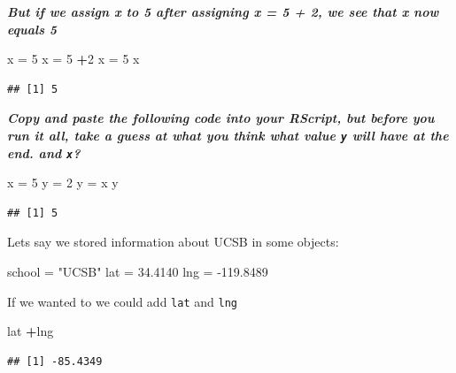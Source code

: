 \documentclass[
]{article}
\newenvironment{Shaded}{\begin{snugshade}}{\end{snugshade}}
\newcommand{\DecValTok}[1]{\textcolor[rgb]{0.00,0.00,0.81}{#1}}
\newcommand{\FloatTok}[1]{\textcolor[rgb]{0.00,0.00,0.81}{#1}}
\newcommand{\NormalTok}[1]{#1}
\newcommand{\OperatorTok}[1]{\textcolor[rgb]{0.81,0.36,0.00}{\textbf{#1}}}
\newcommand{\StringTok}[1]{\textcolor[rgb]{0.31,0.60,0.02}{#1}}
\begin{document}
\textbf{\emph{But if we assign x to 5 after assigning x = 5 + 2, we see
that x now equals 5}}

\begin{Shaded}
\begin{Highlighting}[]
\NormalTok{x =}\StringTok{ }\DecValTok{5} 
\NormalTok{x =}\StringTok{ }\DecValTok{5} \OperatorTok{+}\DecValTok{2}
\NormalTok{x =}\StringTok{ }\DecValTok{5} 
\NormalTok{x}
\end{Highlighting}
\end{Shaded}

\begin{verbatim}
## [1] 5
\end{verbatim}

\textbf{\emph{Copy and paste the following code into your RScript, but
before you run it all, take a guess at what you think what value
\texttt{y} will have at the end. and \texttt{x}?}}

\begin{Shaded}
\begin{Highlighting}[]
\NormalTok{x =}\StringTok{ }\DecValTok{5}
\NormalTok{y =}\StringTok{ }\DecValTok{2}
\NormalTok{y =}\StringTok{ }\NormalTok{x}
\NormalTok{y}
\end{Highlighting}
\end{Shaded}

\begin{verbatim}
## [1] 5
\end{verbatim}

Lets say we stored information about UCSB in some objects:

\begin{Shaded}
\begin{Highlighting}[]
\NormalTok{school =}\StringTok{ "UCSB"}
\NormalTok{lat =}\StringTok{ }\FloatTok{34.4140}
\NormalTok{lng =}\StringTok{ }\FloatTok{-119.8489}
\end{Highlighting}
\end{Shaded}

If we wanted to we could add \texttt{lat} and \texttt{lng}

\begin{Shaded}
\begin{Highlighting}[]
\NormalTok{lat }\OperatorTok{+}\NormalTok{lng}
\end{Highlighting}
\end{Shaded}

\begin{verbatim}
## [1] -85.4349
\end{verbatim}
\end{document}
